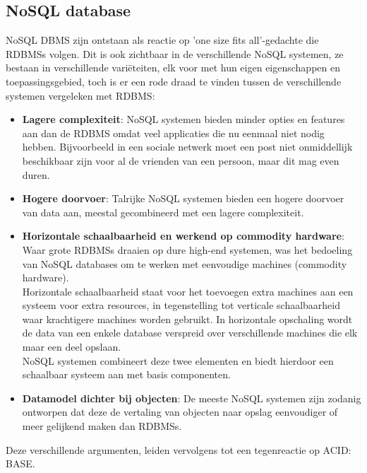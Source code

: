 \subsection{NoSQL database}\label{sec:eventualconsistency}
NoSQL DBMS zijn ontstaan als reactie op 'one size fits all'-gedachte die R\glspl{DBMS} volgen. Dit is ook zichtbaar in de verschillende NoSQL systemen, ze bestaan in verschillende variëteiten, elk voor met hun eigen eigenschappen en toepassingsgebied, toch is er een rode draad te vinden tussen de verschillende systemen vergeleken met R\gls{DBMS}: 
\begin{itemize}
	\item \textbf{Lagere complexiteit}: NoSQL systemen bieden minder opties en features aan dan de R\gls{DBMS} omdat veel applicaties die nu eenmaal niet nodig hebben. Bijvoorbeeld in een sociale netwerk moet een post niet onmiddellijk beschikbaar zijn voor al de vrienden van een persoon, maar dit mag even duren.
	\item \textbf{Hogere doorvoer}: Talrijke NoSQL systemen bieden een hogere doorvoer van data aan, meestal gecombineerd met een lagere complexiteit. 
	\item \textbf{Horizontale schaalbaarheid en werkend op commodity hardware}: Waar grote R\glspl{DBMS} draaien op dure high-end systemen, was het bedoeling van NoSQL databases om te werken met eenvoudige machines (commodity hardware). \\
	Horizontale schaalbaarheid staat voor het toevoegen extra machines aan een systeem voor extra resources, in tegenstelling tot verticale schaalbaarheid waar krachtigere machines worden gebruikt. In horizontale opschaling wordt de data van een enkele database verspreid over verschillende machines die elk maar een deel opslaan.\\
	NoSQL systemen combineert deze twee elementen en biedt hierdoor een schaalbaar systeem aan met basis componenten.
	\item \textbf{Datamodel dichter bij objecten}: De meeste NoSQL systemen zijn zodanig ontworpen dat deze de vertaling van objecten naar opslag eenvoudiger of meer gelijkend maken dan R\glspl{DBMS}.  
\end{itemize}  \noindent
Deze verschillende argumenten, leiden vervolgens tot een tegenreactie op ACID: BASE. \noindent
